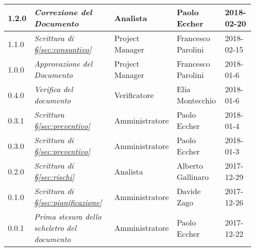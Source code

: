 \begin{longtable}[H]{C{2cm}|C{4cm}|C{3cm}|C{3cm}|R{2cm}}
		1.2.0 &\emph{Correzione del Documento} & Analista & Paolo Eccher & 2018-02-20 \\
		\hline
		
		1.1.0 &\emph{Scrittura di §\ref{sec:consuntivo}} & Project Manager & Francesco Parolini & 2018-02-15 \\
		\hline
		
		1.0.0 &\emph{Approvazione del Documento} & Project Manager & Francesco Parolini & 2018-01-6 \\
		\hline
		
		0.4.0 &\emph{Verifica del documento} & Verificatore & Elia Montecchio & 2018-01-6 \\
		\hline
		
		0.3.1 &\emph{Scrittura §\ref{sec:preventivo}} & Amministratore & Paolo Eccher  & 2018-01-4 \\
		\hline
		
		0.3.0 &\emph{Scrittura di §\ref{sec:preventivo}} & Amministratore & Paolo Eccher & 2018-01-3 \\
		\hline
		
		0.2.0 &\emph{Scrittura di §\ref{sec:rischi}} & Analista & Alberto Gallinaro & 2017-12-29 \\
		\hline
		
		0.1.0 &\emph{Scrittura di §\ref{sec:pianificazione}} & Amministratore & Davide Zago & 2017-12-26 \\
		\hline
		
		0.0.1 &\emph{Prima stesura dello scheletro del documento} & Amministratore & Paolo Eccher & 2017-12-22 \\
		
\end{longtable}
	

\clearpage